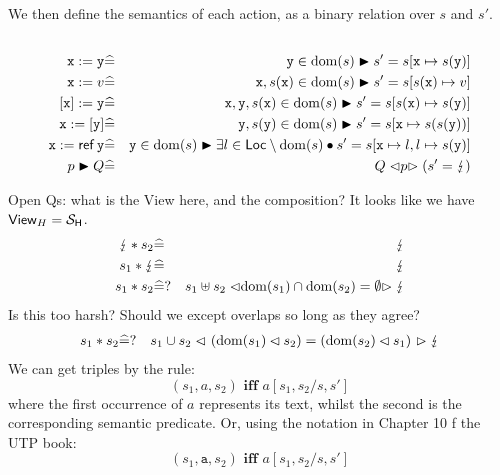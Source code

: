 We then define the semantics of each action,
as a binary relation over $s$ and $s'$.
\begin{eqnarray*}
\\ \mathtt{x}:=\mathtt{y}
   &\widehat=& \mathtt{y} \in \mathrm{dom}(s) \blacktriangleright
           s' = s[\mathtt{x} \mapsto s(\mathtt{y})]
\\ \mathtt{x}:=v
   &\widehat=& \mathtt{x},s(\mathtt{x}) \in \mathrm{dom}(s) \blacktriangleright
           s' = s[s(\mathtt{x}) \mapsto v]
\\ ~[\mathtt{x}]:=\mathtt{y}
   &\widehat=& \mathtt{x},\mathtt{y},s(\mathtt{x}) \in \mathrm{dom}(s) \blacktriangleright
           s' = s[s(\mathtt{x}) \mapsto s(\mathtt{y})]
\\ \mathtt{x}:=[\mathtt{y}]
   &\widehat=& \mathtt{y},s(\mathtt{y}) \in \mathrm{dom}(s) \blacktriangleright
           s' = s[\mathtt{x} \mapsto s(s(\mathtt{y}))]
\\ \mathtt{x}:=\mathop{\mathsf{ref}}\mathtt{y}
              &\widehat=& \mathtt{y} \in \mathrm{dom}(s) \blacktriangleright
              \exists l \in \mathsf{Loc} \setminus \mathrm{dom}(s) \bullet
               s' = s[\mathtt{x} \mapsto l,l \mapsto s(\mathtt{y})]
\\ p \blacktriangleright Q &\widehat=& Q \mathrel{\lhd{p}\rhd} ( s'=\lightning )
\end{eqnarray*}

Open Qs: what is the View here, and the composition?
It looks like we have $\mathsf{View}_{H} = \mathcal{S}_{\mathsf{H}}$.
\begin{eqnarray*}
   \lightning * s_2 &\widehat=& \lightning
\\ s_1 * \lightning &\widehat=& \lightning
\\  s_1 * s_2
   &\widehat=?& s_1
   \uplus s_2
   \mathrel{\lhd{\mathrm{dom}(s_1)\cap\mathrm{dom}(s_2)=\emptyset}\rhd}
   \lightning
\end{eqnarray*}
Is this too harsh?
Should we except overlaps so long as they agree?
\begin{eqnarray*}
   s_1 * s_2
   &\widehat=?& s_1
   \cup s_2
   \mathrel{\lhd{~(\mathrm{dom}(s_1)\lhd s_2) = (\mathrm{dom}(s_2)\lhd s_1)~}\rhd}
   \lightning
\end{eqnarray*}
We can get triples by the rule:
\[
  (s_1,a,s_2) \textbf{ iff } a[s_1,s_2/s,s']
\]
where the first occurrence of $a$ represents its text,
whilst the second is the corresponding semantic predicate.
Or, using the notation in Chapter 10 f the UTP book:
\[
  (s_1,\texttt{a},s_2) \textbf{ iff } a[s_1,s_2/s,s']
\]
